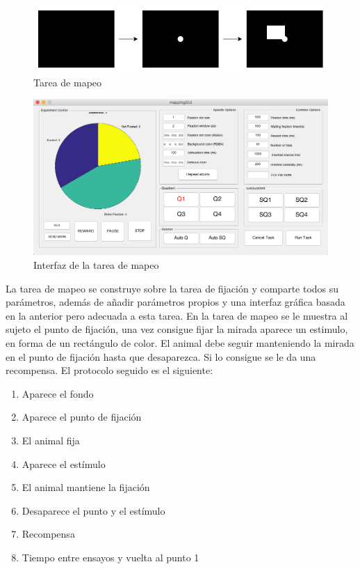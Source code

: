 \documentclass[conference]{IEEEtran}
\begin{document}
\begin{figure}[htbp]
\centerline{\includegraphics[width=\linewidth]{figures/mapping_task}}
\caption{Tarea de mapeo}
\label{figMapTask}
\end{figure}

\begin{figure}[htbp]
\centerline{\includegraphics[width=\linewidth]{figures/mapping_gui}}
\caption{Interfaz de la tarea de mapeo}
\label{figmappingGUI}
\end{figure}

La tarea de mapeo se construye sobre la tarea de fijación y comparte todos su parámetros, además de añadir parámetros propios y una interfaz gráfica basada en la anterior pero adecuada a esta tarea.
En la tarea de mapeo se le muestra al sujeto el punto de fijación, una vez consigue fijar la mirada aparece un estimulo, en forma de un rectángulo de color. El animal debe seguir manteniendo la mirada en el punto de fijación hasta que desaparezca. Si lo consigue se le da una recompensa.
El protocolo seguido es el siguiente:

\begin{enumerate}
	\item Aparece el fondo
	\item Aparece el punto de fijación
	\item El animal fija
	\item Aparece el estímulo
	\item El animal mantiene la fijación
	\item Desaparece el punto y el estímulo
	\item Recompensa
	\item Tiempo entre ensayos y vuelta al punto 1
\end{enumerate}
\end{document}
